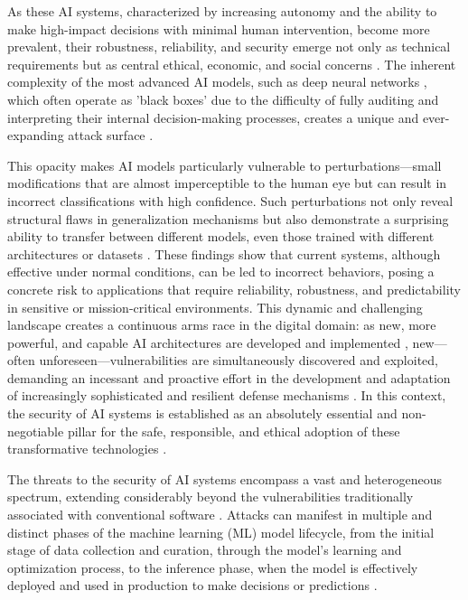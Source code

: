 \documentclass[twoside,brazilian,english]{UNISINOSmonografia}
\begin{document}
As these AI systems, characterized by increasing autonomy and the ability to make high-impact decisions with minimal human intervention, become more prevalent, their robustness, reliability, and security emerge not only as technical requirements but as central ethical, economic, and social concerns \cite{Bommasani2021}. The inherent complexity of the most advanced AI models, such as deep neural networks \cite{Hinton2006}, which often operate as 'black boxes' due to the difficulty of fully auditing and interpreting their internal decision-making processes, creates a unique and ever-expanding attack surface \cite{Papernot2018}.

This opacity makes AI models particularly vulnerable to perturbations—small modifications that are almost imperceptible to the human eye but can result in incorrect classifications with high confidence. Such perturbations not only reveal structural flaws in generalization mechanisms but also demonstrate a surprising ability to transfer between different models, even those trained with different architectures or datasets \cite{Szegedy2014, Goodfellow2014}. These findings show that current systems, although effective under normal conditions, can be led to incorrect behaviors, posing a concrete risk to applications that require reliability, robustness, and predictability in sensitive or mission-critical environments. This dynamic and challenging landscape creates a continuous arms race in the digital domain: as new, more powerful, and capable AI architectures are developed and implemented \cite{Vaswani2017, OpenAI2023}, new—often unforeseen—vulnerabilities are simultaneously discovered and exploited, demanding an incessant and proactive effort in the development and adaptation of increasingly sophisticated and resilient defense mechanisms \cite{Madry2017, Cohen2019}. In this context, the security of AI systems is established as an absolutely essential and non-negotiable pillar for the safe, responsible, and ethical adoption of these transformative technologies \cite{NIST2024}.

The threats to the security of AI systems encompass a vast and heterogeneous spectrum, extending considerably beyond the vulnerabilities traditionally associated with conventional software \cite{Anderson2020}. Attacks can manifest in multiple and distinct phases of the machine learning (ML) model lifecycle, from the initial stage of data collection and curation, through the model's learning and optimization process, to the inference phase, when the model is effectively deployed and used in production to make decisions or predictions \cite{Papernot2018}.
\end{document}

